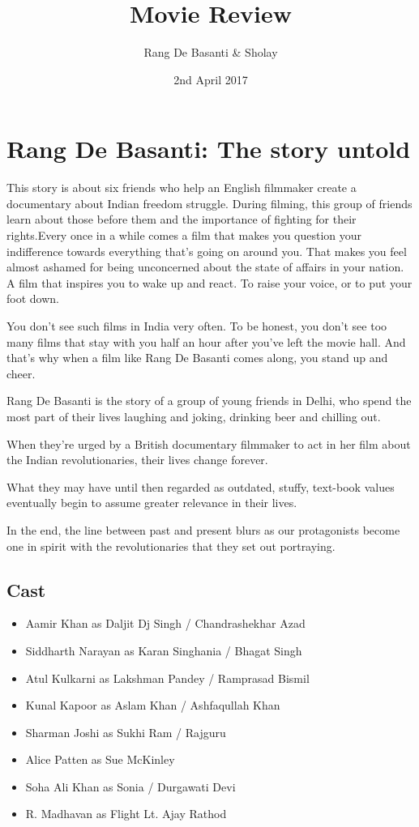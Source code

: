 \documentclass{article}
\title{Movie Review}
\author{Rang De Basanti \& Sholay }
\date{2nd April 2017}
\begin{document}
\maketitle

\section{Rang De Basanti: The story untold}
This story is about six friends who help an English filmmaker create a documentary about Indian freedom struggle. During filming, this group of friends learn about those before them and the importance of fighting for their rights.Every once in a while comes a film that makes you question your indifference towards everything that’s going on around you. That makes you feel almost ashamed for being unconcerned about the state of affairs in your nation. A film that inspires you to wake up and react. To raise your voice, or to put your foot down.

You don’t see such films in India very often. To be honest, you don’t see too many films that stay with you half an hour after you’ve left the movie hall. And that’s why when a film like Rang De Basanti comes along, you stand up and cheer.

Rang De Basanti is the story of a group of young friends in Delhi, who spend the most part of their lives laughing and joking, drinking beer and chilling out.

When they’re urged by a British documentary filmmaker to act in her film about the Indian revolutionaries, their lives change forever.

What they may have until then regarded as outdated, stuffy, text-book values eventually begin to assume greater relevance in their lives.

In the end, the line between past and present blurs as our protagonists become one in spirit with the revolutionaries that they set out portraying. 
\subsection{Cast}

\begin{itemize}
    \item Aamir Khan as Daljit Dj Singh / Chandrashekhar Azad
    \item Siddharth Narayan as Karan Singhania / Bhagat Singh
    \item Atul Kulkarni as Lakshman Pandey / Ramprasad Bismil
    \item Kunal Kapoor as Aslam Khan / Ashfaqullah Khan
    \item Sharman Joshi as Sukhi Ram / Rajguru
    \item Alice Patten as Sue McKinley
    \item Soha Ali Khan as Sonia / Durgawati Devi
    \item R. Madhavan as Flight Lt. Ajay Rathod
\end{itemize}
\end{document}
